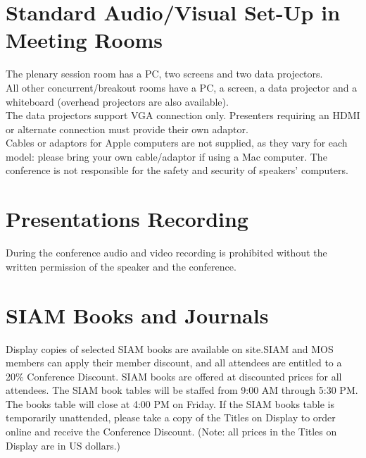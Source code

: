 \section*{Standard Audio/Visual Set-Up in Meeting Rooms}
The plenary session room has a PC, two screens and two data projectors.\\ 
All other concurrent/breakout rooms have a PC, a screen, a data projector and a whiteboard (overhead projectors are also available).\\
The data projectors support VGA connection only. Presenters requiring an HDMI or alternate connection must provide their own adaptor.\\
Cables or adaptors for Apple computers are not supplied, as they vary for each model: please bring your own cable/adaptor if using a Mac computer. 
The conference is not responsible for the safety and security of speakers' computers.\\
\section*{Presentations Recording}
During the conference audio and video recording is prohibited without the written permission of the speaker and the conference.
\section*{SIAM Books and Journals}

Display copies of selected SIAM books are available on site.SIAM and MOS members can apply their member discount, and all attendees are entitled to a 20\% Conference Discount. SIAM books are offered at discounted prices for all attendees. The SIAM book tables will be staffed from 9:00 AM through 5:30 PM. The books table will close at 4:00 PM on Friday.  If the SIAM books table is temporarily unattended, please take a copy of the Titles on Display to order online and receive the Conference Discount. (Note: all prices in the Titles on Display are in US dollars.) 

